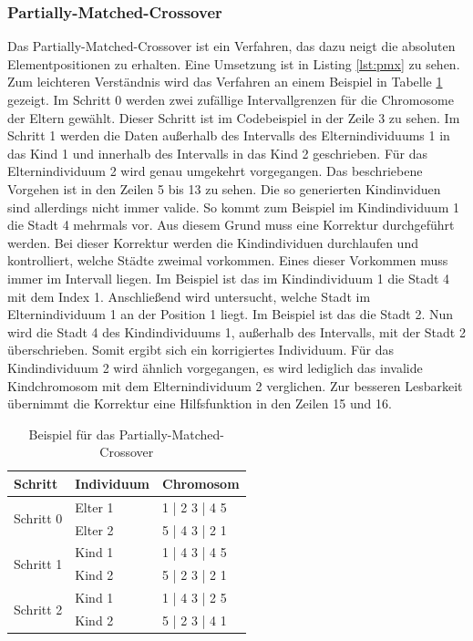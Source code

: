 \subsubsection{Partially-Matched-Crossover}
Das Partially-Matched-Crossover \cite[S. 273]{schoeneburg} ist ein Verfahren, das dazu neigt die absoluten Elementpositionen zu erhalten. Eine Umsetzung ist in Listing \ref{lst:pmx} zu sehen. Zum leichteren Verständnis wird das Verfahren an einem Beispiel in Tabelle \ref{tab:pmx} gezeigt.
Im Schritt 0 werden zwei zufällige Intervallgrenzen für die Chromosome der Eltern gewählt. Dieser Schritt ist im Codebeispiel in der Zeile 3 zu sehen.
Im Schritt 1 werden die Daten außerhalb des Intervalls des Elternindividuums 1 in das Kind 1 und innerhalb des Intervalls in das Kind 2 geschrieben. Für das Elternindividuum 2 wird genau umgekehrt vorgegangen. Das beschriebene Vorgehen ist in den Zeilen 5 bis 13 zu sehen.
Die so generierten Kindinviduen sind allerdings nicht immer valide. So kommt zum Beispiel im Kindindividuum 1 die Stadt 4 mehrmals vor. Aus diesem Grund muss eine Korrektur durchgeführt werden.
Bei dieser Korrektur werden die Kindindividuen durchlaufen und kontrolliert, welche Städte zweimal vorkommen. Eines dieser Vorkommen muss immer im Intervall liegen. Im Beispiel ist das im Kindindividuum 1 die Stadt 4 mit dem Index 1. Anschließend wird untersucht, welche Stadt im Elternindividuum 1 an der Position 1 liegt. Im Beispiel ist das die Stadt 2. Nun wird die Stadt 4 des Kindindividuums 1, außerhalb des Intervalls, mit der Stadt 2 überschrieben. Somit ergibt sich ein korrigiertes Individuum. Für das Kindindividuum 2 wird ähnlich vorgegangen, es wird lediglich das invalide Kindchromosom mit dem Elternindividuum 2 verglichen.
Zur besseren Lesbarkeit übernimmt die Korrektur eine Hilfsfunktion in den Zeilen 15 und 16.
\begin{table}[!htb]
\centering
\caption{Beispiel für das Partially-Matched-Crossover}
\begin{tabularx}{0.5\textwidth}{l|l|l}
Schritt & Individuum & Chromosom\\
\hline
\multirow{2}{*}{Schritt 0}
		& Elter 1 & 1 | 2 3 | 4 5\\
		&  Elter 2 & 5 | 4 3 | 2 1\\
\hline
\multirow{2}{*}{Schritt 1}
		& Kind 1 &  1 | 4 3 | 4 5\\
		&  Kind 2 & 5 | 2 3 | 2 1\\
\hline
\multirow{2}{*}{Schritt 2}
		& Kind 1 &  1 | 4 3 | 2 5\\
		&  Kind 2 & 5 | 2 3 | 4 1\\
\end{tabularx}
\label{tab:pmx}
\end{table}

